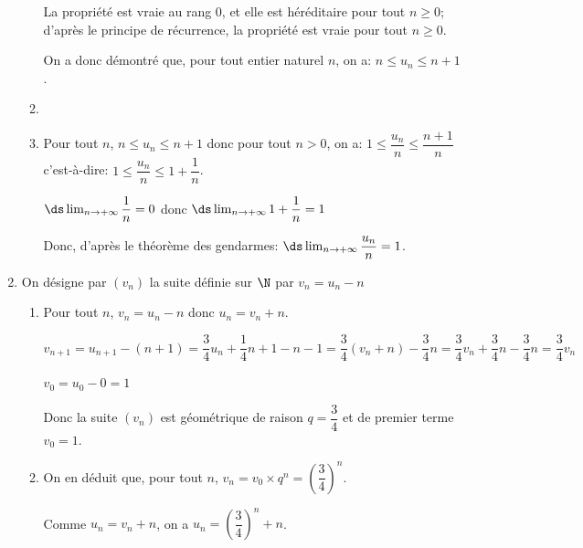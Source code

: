 \begin{enumerate}[resume]
\begin{enumerate}
\begin{list}{\textbullet}{}
La propriété est vraie au rang 0, et elle est héréditaire pour tout $n\geqslant 0$; d'après le principe de récurrence, la propriété est vraie pour tout $n\geqslant 0$.
\end{list}		

On a donc démontré que, pour tout entier naturel $n$, on a: $n \leqslant u_n \leqslant n + 1$.
		
		\item
{}		
		
		
		\item
Pour tout $n$, $n\leqslant u_n \leqslant n+1$ donc pour tout $n>0$, on a:
$1 \leqslant \dfrac{u_n}{n} \leqslant \dfrac{n+1}{n}$ c'est-à-dire: 
$1 \leqslant \dfrac{u_n}{n} \leqslant 1+\dfrac{1}{n}$.

$\ds\lim_{n \to +\infty} \dfrac{1}{n}=0$ donc $\ds\lim_{n \to +\infty} 1+\dfrac{1}{n}=1$

Donc, d'après le théorème des gendarmes: $\ds\lim_{n\to +\infty} \dfrac{u_n}{n}=1$.

	\end{enumerate}
\item  On désigne par $\left(v_n\right)$ la suite définie sur $\N$ par $v_n = u_n - n$
	\begin{enumerate}
		\item
Pour tout $n$, $v_n=u_n-n$ donc $u_n=v_n+n$.

$v_{n+1}=u_{n+1} - (n+1) = 	\dfrac{3}{4}u_n + \dfrac{1}{4}n+1 -n-1
=\dfrac{3}{4}\left (v_n+n\right ) -\dfrac{3}{4}n
=\dfrac{3}{4}v_n +\dfrac{3}{4}n -\dfrac{3}{4}n
=\dfrac{3}{4}v_n$

$v_0=u_0-0=1$

Donc la suite $(v_n)$ est géométrique de raison $q=\dfrac{3}{4}$ et de premier terme $v_0=1$.
		
		
		\item 
On en déduit que, pour tout $n$, $v_n=v_0\times q^n = \left (\dfrac{3}{4}\right )^n$.

Comme $u_n=v_n+n$, on a $u_n=\left (\dfrac{3}{4}\right )^n + n$.		
		
	\end{enumerate}
\end{enumerate}

\bigskip
